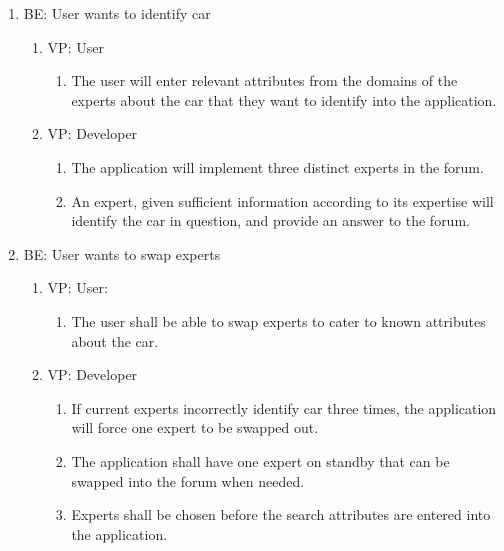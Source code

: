 \documentclass[12pt]{article}
\begin{document}
\begin{enumerate}
    \item BE: User wants to identify car
    \begin{enumerate}
        \item VP: User
        \begin{enumerate}
            \item The user will enter relevant attributes from the domains of the experts about the car that they want to identify into the application.
        \end{enumerate}
        \item VP: Developer
        \begin{enumerate}
            \item The application will implement three distinct experts in the forum.
            \item An expert, given sufficient information according to its expertise will identify the car in question, and provide an answer to the forum.
        \end{enumerate}
    \end{enumerate}

	\item BE: User wants to swap experts
	\begin{enumerate}
		\item VP: User:
		\begin{enumerate}
			\item The user shall be able to swap experts to cater to known attributes about the car.
		\end{enumerate}
		\item VP: Developer
		\begin{enumerate}
			\item If current experts incorrectly identify car three times, the application will force one expert to be swapped out.
			\item The application shall have one expert  on standby that can be swapped into the forum when needed.
			\item Experts shall be chosen before the search attributes are entered into the application.
		\end{enumerate}
	\end{enumerate}


\end{enumerate}
\end{document}

